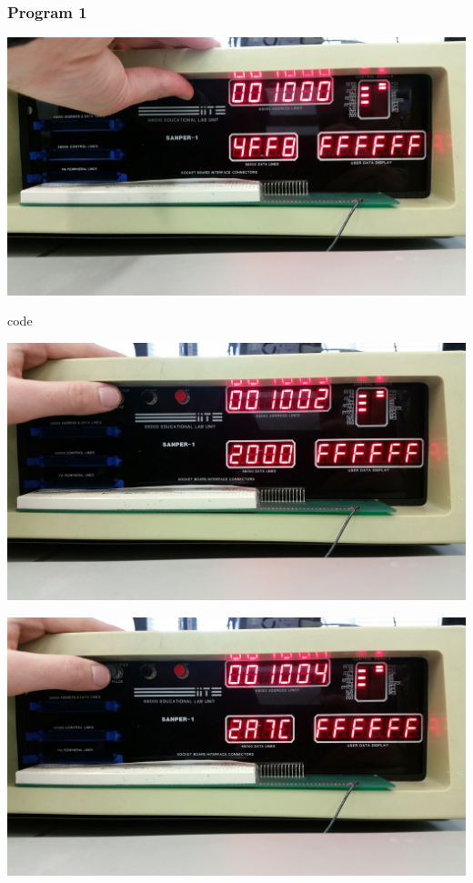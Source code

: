 \documentclass[12pt, twocolumn]{article}
\begin{document}
\subsubsection{Program 1}
\label{progpic1}
\begin{center}
\includegraphics[width=\linewidth]{Lab1/20150120_093554}
\end{center}code
\begin{center}
\includegraphics[width=\linewidth]{Lab1/20150120_093559}
\end{center}
\begin{center}
\includegraphics[width=\linewidth]{Lab1/20150120_093601}
\end{center}
\end{document}
